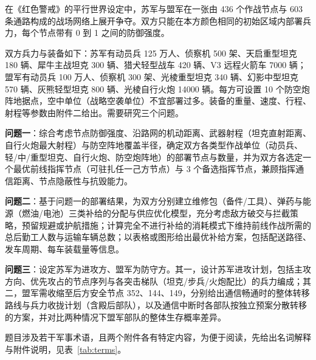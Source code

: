 \documentclass[12pt,a4paper]{ctexart}
\begin{document}
在《红色警戒》的平行世界设定中，苏军与盟军在一张由 436 个作战节点与 603 条通路构成的战场网络上展开争夺\cite{ref1}。双方只能在本方颜色相同的初始区域内部署兵力，每个节点带有 0 到 1 之间的防御强度。

双方兵力与装备如下：苏军有动员兵 125 万人、侦察机 500 架、天启重型坦克 180 辆、犀牛主战坦克 300 辆、猎犬轻型战车 420 辆、V3 远程火箭车 7000 辆；盟军有动员兵 100 万人、侦察机 300 架、光棱重型坦克 340 辆、幻影中型坦克 570 辆、灰熊轻型坦克 800 辆、光棱自行火炮 14000 辆。每方可设置 10 个防空炮阵地据点，空中单位（战略空袭单位）不宜部署过多。装备的重量、速度、行程、射程等参数由附件二给出。需要研究三个问题。

\textbf{问题一}：综合考虑节点防御强度、沿路网的机动距离、武器射程（坦克直射距离、自行火炮最大射程）与防空阵地覆盖半径，确定双方各类型作战单位（动员兵、轻/中/重型坦克、自行火炮、防空炮阵地）的部署节点与数量，并为双方各选定一个最优前线指挥节点（可驻扎任一己方节点）与 3 个备选指挥节点，兼顾指挥通信距离、节点隐蔽性与抗毁能力。

\textbf{问题二}：基于问题一的部署结果，为双方分别建立维修包（备件/工具）、弹药与能源（燃油/电池）三类补给的分配与供应优化模型，充分考虑敌方破交与拦截策略，预留规避或护航措施；计算完全不进行补给的消耗模式下维持前线作战所需的总后勤工人数与运输车辆总数；以表格或图形给出最优补给方案，包括配送路径、发车周期、每车装载量等信息。

\textbf{问题三}：设定苏军为进攻方、盟军为防守方。其一，设计苏军进攻计划，包括主攻方向、优先攻占的节点序列与各突击梯队（坦克/步兵/火炮配比）的兵力编成；其二，盟军需收缩至后方安全节点 352、144、149，分别给出通信畅通时的整体转移路线与兵力收拢计划（含殿后部队），以及通信中断时各部队按独立预案分散转移的方案，并对比两种情况下盟军部队的整体生存概率差异。

题目涉及若干军事术语，且两个附件各有特定内容，为便于阅读，先给出名词解释与附件说明，见表~\ref{tab:terms}。
\end{document}
